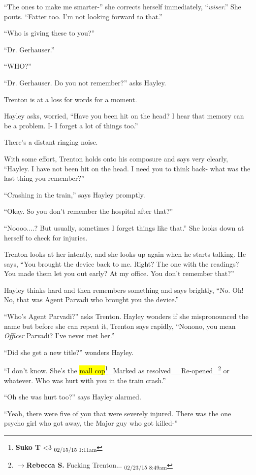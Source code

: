 ``The ones to make me smarter-'' she corrects herself immediately, ``\textit{wiser}.''  She pouts.  ``Fatter too.  I'm not looking forward to that.''

``Who is giving these to you?''

``Dr. Gerhauser.''

``WHO?''

``Dr. Gerhauser.  Do you not remember?'' asks Hayley.

Trenton is at a loss for words for a moment.

Hayley asks, worried, ``Have you been hit on the head?  I hear that memory can be a problem.  I- I forget a lot of things too.''

There's a distant ringing noise.

With some effort, Trenton holds onto his composure and says very clearly, ``Hayley. I have not been hit on the head.  I need you to think back- what was the last thing you remember?''

``Crashing in the train,'' says Hayley promptly.

``Okay.  So you don't remember the hospital after that?''

``Noooo....?  But usually, sometimes I forget things like that.''  She looks down at herself to check for injuries.

Trenton looks at her intently, and she looks up again when he starts talking.  He says, ``You brought the device back to me.  Right?  The one with the readings?  You made them let you out early?  At my office.  You don't remember that?''

Hayley thinks hard and then remembers something and says brightly, ``No.  Oh!  No, that was Agent Parvadi who brought you the device.''

``Who's Agent Parvadi?'' asks Trenton.  Hayley wonders if she mispronounced the name but before she can repeat it, Trenton says rapidly, ``Nonono, you mean\textit{ Officer} Parvadi?  I've never met her.''  

``Did she get a new title?'' wonders Hayley.

``I don't know.  She's the \hl{mall cop}\footnote{\textbf{Suko T }\textless 3 \textsubscript{02/15/15 1:11am}}\_Marked as resolved\_\_Re-opened\_\footnote{$\rightarrow$\textbf{Rebecca S. }Fucking Trenton... \textsubscript{02/23/15 8:49am}} or whatever.  Who was hurt with you in the train crash.''

``Oh she was hurt too?'' says Hayley alarmed.  

``Yeah, there were five of you that were severely injured.  There was the one psycho girl who got away, the Major guy who got killed-''


